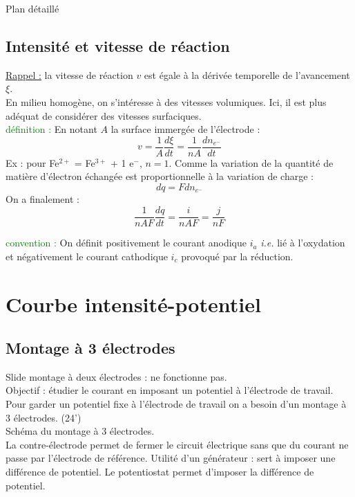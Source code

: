 \begin{reportBlock}{Plan détaillé}
\subsection{Intensité et vitesse de réaction}
\underline{Rappel :} la vitesse de réaction $v$ est égale à la dérivée temporelle de l'avancement $\xi$.\\
En milieu homogène, on s'intéresse à des vitesses volumiques. Ici, il est plus adéquat de considérer des vitesses surfaciques.\\
\textcolor{green}{définition :} En notant $A$ la surface immergée de l'électrode : 
\begin{equation}
    v = \frac{1}{A}\frac{d\xi}{dt} = \frac{1}{nA}\frac{dn_{e^-}}{dt}
\end{equation}
Ex : pour Fe$^{2+}$ = Fe$^{3+}$ + 1 e$^-$, $n=1$. Comme la variation de la quantité de matière d'électron échangée est proportionnelle à la variation de charge :
\begin{equation}
    dq = Fdn_{e^-}
\end{equation}
On a finalement :
\begin{equation}
    \frac{1}{nAF}\frac{dq}{dt} = \frac{i}{nAF} = \frac{j}{nF}
    \end{equation}

\textcolor{green}{convention :} On définit positivement le courant anodique $i_a$ \textit{i.e.} lié à l'oxydation et négativement le courant cathodique $i_c$ provoqué par la réduction.

\section{Courbe intensité-potentiel}

\subsection{Montage à 3 électrodes}
Slide montage à deux électrodes : ne fonctionne pas.\\
Objectif : étudier le courant en imposant un potentiel à l'électrode de travail. Pour garder un potentiel fixe à l'électrode de travail on a besoin d'un montage à 3 électrodes. (24')\\
Schéma du montage à 3 électrodes.\\ 
La contre-électrode permet de fermer le circuit électrique sans que du courant ne passe par l'électrode de référence. Utilité d'un générateur : sert à imposer une différence de potentiel. Le potentiostat permet d'imposer la différence de potentiel.


\end{reportBlock}
